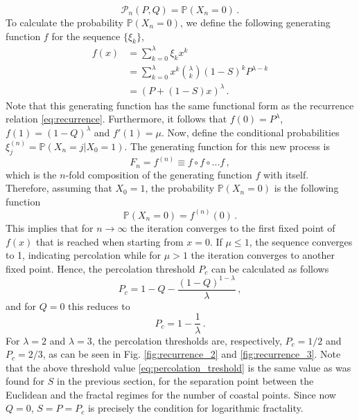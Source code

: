 \documentclass[amsmath,amssymb,amsfonts,aps,pre,preprint,superscriptaddress,bibnotes,showpacs,showkeys,longbibliography,nofootinbib]{revtex4-1}
\begin{document}
\begin{equation}
    \mathcal{P}_n(P,Q) = \mathbb{P}(X_n =0)\, .
\end{equation}
To calculate the probability $\mathbb{P}(X_n =0)$, we define the following generating function $f$ for the sequence $\{\xi_k\}$,
\begin{equation}
    \label{eq:generating_function}
    \begin{split}
    f(x) &= \sum\limits_{k=0}^\lambda \xi_k x^k \\
    &= \sum\limits_{k=0}^\lambda x^k {\lambda \choose k} (1-S)^k P^{\lambda-k}\\
    &= (P+(1-S)x)^\lambda\, .
    \end{split}
\end{equation}
Note that this generating function has the same functional form as the recurrence relation \eqref{eq:recurrence}. Furthermore, it follows that $f(0) = P^\lambda$, $f(1) = (1-Q)^\lambda$ and $f'(1) = \mu$. Now, define the conditional probabilities $\xi_j^{(n)} = \mathbb{P}(X_{n} = j|X_0=1)$. The generating function for this new process is
\begin{equation}
    \label{eq:generating_function_composed}
    F_n = f^{(n)} \equiv f\circ f\circ...f\, ,
\end{equation}
which is the $n$-fold composition of the generating function $f$ with itself. Therefore, assuming that $X_0 = 1$, the probability $\mathbb{P}(X_n=0)$ is the following function
\begin{equation}
    \label{eq:prob_zero}
    \mathbb{P}(X_n=0) = f^{(n)}(0)\, .
\end{equation}
This implies that for $n\rightarrow\infty$ the iteration converges to the first fixed point of $f(x)$ that is reached when starting from $x=0$. If $\mu\leq1$, the sequence converges to 1, indicating percolation while for $\mu>1$ the iteration converges to another fixed point. Hence, the percolation threshold $P_c$ can be calculated as follows
\begin{equation}
    \label{eq:percolation_treshold_full}
        P_c = 1-Q-\frac{(1-Q)^{1-\lambda}}{\lambda}\, ,
\end{equation}
and for $Q=0$ this reduces to
\begin{equation}
\label{eq:percolation_treshold}
    P_c = 1-\frac{1}{\lambda}\, .
\end{equation}
For $\lambda=2$ and $\lambda=3$, the percolation thresholds are, respectively, $P_c = 1/2$ and $P_c = 2/3$, as can be seen in Fig. \ref{fig:recurrence_2} and \ref{fig:recurrence_3}. Note that the above threshold value \eqref{eq:percolation_treshold} is the same value as was found for $S$ in the previous section, for the separation point between the Euclidean and the fractal regimes for the number of coastal points. Since now $Q=0$, $S=P=P_c$ is precisely the condition for logarithmic fractality. 
\end{document}
